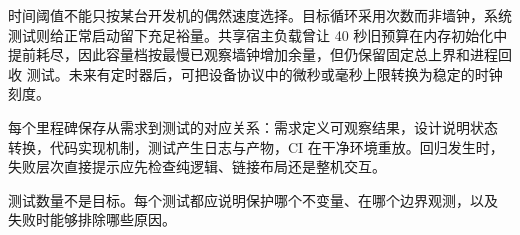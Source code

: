 时间阈值不能只按某台开发机的偶然速度选择。目标循环采用次数而非墙钟，系统
测试则给正常启动留下充足裕量。共享宿主负载曾让 40 秒旧预算在内存初始化中
提前耗尽，因此容量档按最慢已观察墙钟增加余量，但仍保留固定总上界和进程回收
测试。未来有定时器后，可把设备协议中的微秒或毫秒上限转换为稳定的时钟刻度。

每个里程碑保存从需求到测试的对应关系：需求定义可观察结果，设计说明状态
转换，代码实现机制，测试产生日志与产物，CI 在干净环境重放。回归发生时，
失败层次直接提示应先检查纯逻辑、链接布局还是整机交互。

测试数量不是目标。每个测试都应说明保护哪个不变量、在哪个边界观测，以及
失败时能够排除哪些原因。
